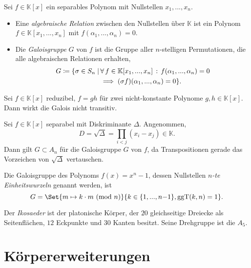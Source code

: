 \documentclass{cheat-sheet}
\newcommand{\K}{\mathbb{K}} %
\DeclareMathOperator{\ggT}{ggT} %
\newcommand{\Mod}[1]{\ (\text{mod}\ #1)} %
\begin{document}
\begin{defn}
  Sei $f \in \K[x]$ ein separables Polynom mit Nullstellen $x_1, ..., x_n$.
  \begin{itemize}
    \item Eine \emph{algebraische Relation} zwischen den Nullstellen über $\K$ ist ein Polynom $f \in \K[x_1, ..., x_n]$ mit $f(\alpha_1, ..., \alpha_n) = 0$.
    \item Die \emph{Galoisgruppe} $G$ von $f$ ist die Gruppe aller $n$-stelligen Permutationen, die alle algebraischen Relationen erhalten, \dh{}
    \begin{align*}
      G \coloneqq \{ \sigma \in S_n \mid & \, \fa{f \in \K[x_1, ..., x_n]} f(\alpha_1, ..., \alpha_n) = 0 \\
      & \implies (\sigma f)(\alpha_1, ..., \alpha_n) = 0 \}.
    \end{align*}
  \end{itemize}
\end{defn}

\begin{lem}
  Sei $f \in \K[x]$ reduzibel, \dh{} $f = gh$ für zwei nicht-konstante Polynome $g, h \in \K[x]$. Dann wirkt die Galois nicht transitiv.
\end{lem}

\begin{bsp}
  Sei $f \in \K[x]$ separabel mit Diskriminante $\Delta$. Angenommen,
  \[ D = \sqrt{\Delta} = \prod_{i < j} (x_i - x_j) \in \K. \]
  Dann gilt $G \subset A_n$ für die Galoisgruppe $G$ von $f$, da Transpositionen gerade das Vorzeichen von $\sqrt{\Delta}$ vertauschen.
\end{bsp}

\begin{samepage}

\begin{bsp}
  Die Galoisgruppe des Polynoms $f(x) = x^n - 1$, dessen Nullstellen \emph{$n$-te Einheitswurzeln} genannt werden, ist
  \[ G = \Set{ m \mapsto k \cdot m \Mod{n} }{ k \in \{ 1, ..., n{-}1 \}, \ggT(k, n) = 1 }. \]
\end{bsp}



\begin{bem}
  Der \emph{Ikosaeder} ist der platonische Körper, der $20$ gleichseitige Dreiecke als Seitenflächen, $12$ Eckpunkte und $30$ Kanten besitzt. Seine Drehgruppe ist die $A_5$.
\end{bem}

\section{Körpererweiterungen}

\end{samepage}
\end{document}
